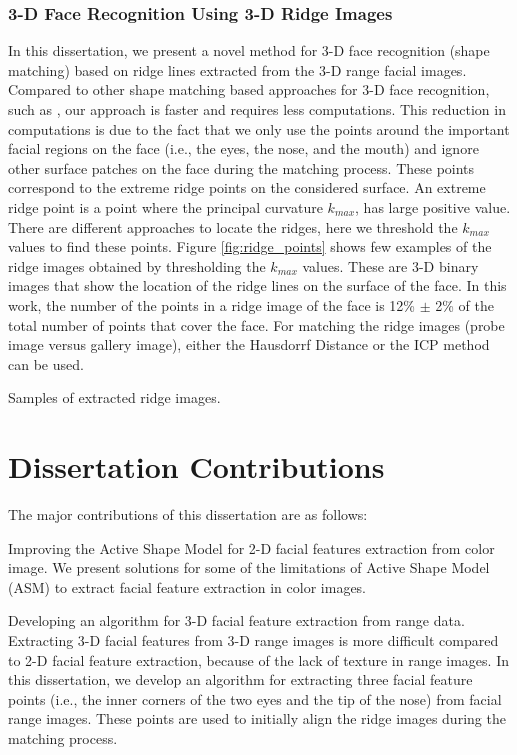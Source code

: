 \subsubsection{3-D Face Recognition Using 3-D Ridge Images}
In this dissertation, we present a novel method for 3-D face
recognition (shape matching) based on ridge lines extracted from the
3-D range facial images. Compared to other shape matching based
approaches for 3-D face recognition, such as \cite{lu06, russ05,
chang05, Maurer05}, our approach is faster and requires less
computations. This reduction in computations is due to the fact that
we only use the points around the important facial regions on the
face (i.e., the eyes, the nose, and the mouth) and ignore other
surface patches on the face during the matching process. These
points correspond to the extreme ridge points on the considered
surface. An extreme ridge point is a point where the principal
curvature $k_{max}$, has large positive value. There are different
approaches to locate the ridges, here we threshold the $k_{max}$
values to find these points. Figure \ref{fig:ridge_points} shows few
examples of the ridge images obtained by thresholding the $k_{max}$
values. These are 3-D binary images that show the location of the
ridge lines on the surface of the face. In this work, the number of
the points in a ridge image of the face is 12\% $\pm$ 2\% of the
total number of points that cover the face. For matching the ridge
images (probe image versus gallery image), either the Hausdorrf
Distance or the ICP method can be used.

\bfig {} \caption{Samples of extracted ridge images.}
\label{fig:ridge_points}\efig

\section{Dissertation Contributions}
The major contributions of this dissertation are as follows:
\bi
\item
Improving the Active Shape Model for 2-D facial features extraction
from color image. We present solutions for some of the limitations
of Active Shape Model (ASM) to extract facial feature extraction in
color images.

\item
Developing an algorithm for 3-D facial feature extraction from range
data. Extracting 3-D facial features from 3-D range images is more
difficult compared to 2-D facial feature extraction, because of the
lack of texture in range images. In this dissertation, we develop an
algorithm for extracting three facial feature points (i.e., the
inner corners of the two eyes and the tip of the nose) from facial
range images. These points are used to initially align the ridge
images during the matching process.

